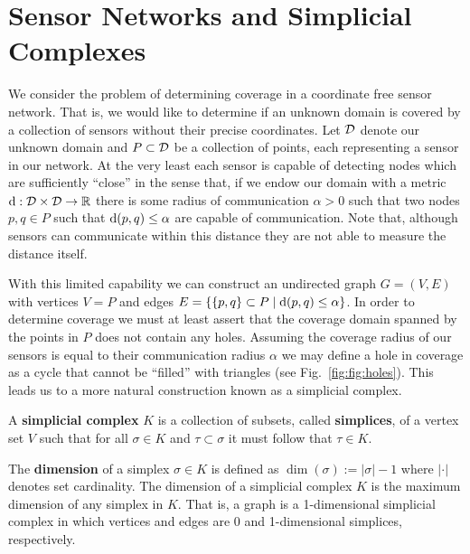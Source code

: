 \section{Sensor Networks and Simplicial Complexes} %
\label{sec:complexes}

We consider the problem of determining coverage in a coordinate free sensor network.
That is, we would like to determine if an unknown domain is covered by a collection of sensors without their precise coordinates.
Let ${\mathcal{D}}$ denote our unknown domain and $P\subset{\mathcal{D}}$ be a collection of points, each representing a sensor in our network.
At the very least each sensor is capable of detecting nodes which are sufficiently ``close'' in the sense that, if we endow our domain with a metric $\mathrm{d}:{\mathcal{D}}\times{\mathcal{D}}\to\mathbb{R}$ there is some radius of communication $\alpha > 0$ such that two nodes $p, q\in P$ such that $\mathrm{d}(p, q) \leq\alpha$ are capable of communication.
Note that, although sensors can communicate within this distance they are not able to measure the distance itself.

With this limited capability we can construct an undirected graph $G=(V,E)$ with vertices $V=P$ and edges $E = \{\{p, q\}\subset P\mid \mathrm{d}(p,q)\leq\alpha\}$.
In order to determine coverage we must at least assert that the coverage domain spanned by the points in $P$ does not contain any holes.
Assuming the coverage radius of our sensors is equal to their communication radius $\alpha$ we may define a hole in coverage as a cycle that cannot be ``filled'' with triangles (see Fig.~\ref{fig:fig:holes}).
This leads us to a more natural construction known as a simplicial complex.
\begin{definition}
   A \textbf{simplicial complex} $K$ is a collection of subsets, called \textbf{simplices}, of a vertex set $V$ such that for all $\sigma\in K$ and $\tau\subset\sigma$ it must follow that $\tau\in K$.
\end{definition}
The \textbf{dimension} of a simplex $\sigma\in K$ is defined as $\dim(\sigma) := |\sigma|-1$ where $|\cdot|$ denotes set cardinality.
The dimension of a simplicial complex $K$ is the maximum dimension of any simplex in $K$.
That is, a graph is a 1-dimensional simplicial complex in which vertices and edges are 0 and 1-dimensional simplices, respectively.

